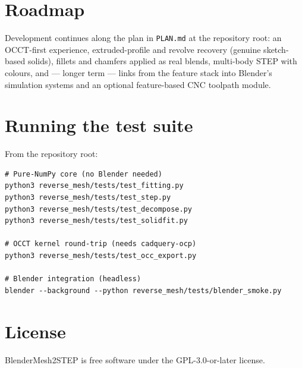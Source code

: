 \documentclass[11pt,a4paper]{article}
\begin{document}
\section{Roadmap}

Development continues along the plan in \texttt{PLAN.md} at the repository
root: an OCCT-first experience, extruded-profile and revolve recovery
(genuine sketch-based solids), fillets and chamfers applied as real blends,
multi-body STEP with colours, and --- longer term --- links from the feature
stack into Blender's simulation systems and an optional feature-based CNC
toolpath module.

\appendix
\section{Running the test suite}

From the repository root:

\begin{lstlisting}
# Pure-NumPy core (no Blender needed)
python3 reverse_mesh/tests/test_fitting.py
python3 reverse_mesh/tests/test_step.py
python3 reverse_mesh/tests/test_decompose.py
python3 reverse_mesh/tests/test_solidfit.py

# OCCT kernel round-trip (needs cadquery-ocp)
python3 reverse_mesh/tests/test_occ_export.py

# Blender integration (headless)
blender --background --python reverse_mesh/tests/blender_smoke.py
\end{lstlisting}

\section{License}

BlenderMesh2STEP is free software under the GPL-3.0-or-later license.
\end{document}
